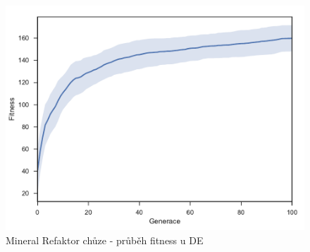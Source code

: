 \begin{figure}[h]\centering
	\includegraphics[width=\columnwidth]{../img/MineralMap/MineralRefaktorWalk}
	\caption{Mineral Refaktor chůze - průběh fitness u DE}
	\label{obr04:MineralRefaktorWalk}
\end{figure}
\clearpage

